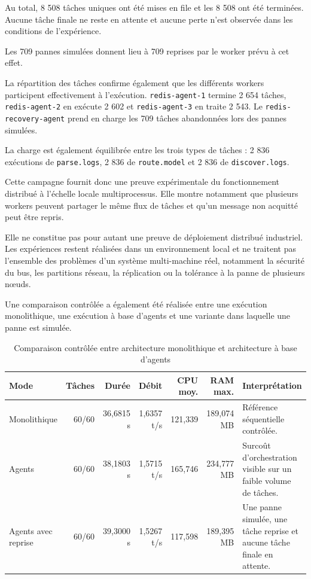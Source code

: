 Au total, 8 508 tâches uniques ont été mises en file et les 8 508 ont été terminées. Aucune tâche finale ne reste en attente et aucune perte n'est observée dans les conditions de l'expérience.

Les 709 pannes simulées donnent lieu à 709 reprises par le worker prévu à cet effet.

La répartition des tâches confirme également que les différents workers participent effectivement à l'exécution. \texttt{redis-agent-1} termine 2 654 tâches, \texttt{redis-agent-2} en exécute 2 602 et \texttt{redis-agent-3} en traite 2 543. Le \texttt{redis-recovery-agent} prend en charge les 709 tâches abandonnées lors des pannes simulées.

La charge est également équilibrée entre les trois types de tâches : 2 836 exécutions de \texttt{parse.logs}, 2 836 de \texttt{route.model} et 2 836 de \texttt{discover.logs}.

Cette campagne fournit donc une preuve expérimentale du fonctionnement distribué à l'échelle locale multiprocessus. Elle montre notamment que plusieurs workers peuvent partager le même flux de tâches et qu'un message non acquitté peut être repris.

Elle ne constitue pas pour autant une preuve de déploiement distribué industriel. Les expériences restent réalisées dans un environnement local et ne traitent pas l'ensemble des problèmes d'un système multi-machine réel, notamment la sécurité du bus, les partitions réseau, la réplication ou la tolérance à la panne de plusieurs nœuds.

Une comparaison contrôlée a également été réalisée entre une exécution monolithique, une exécution à base d'agents et une variante dans laquelle une panne est simulée.

\begin{table}[H]
\centering
\caption{Comparaison contrôlée entre architecture monolithique et architecture à base d'agents}
\label{tab:controlled-monolith-agents}
\scriptsize

\begin{tabularx}{\textwidth}{p{3cm}rrrrrX}
\toprule

\textbf{Mode} &
\textbf{Tâches} &
\textbf{Durée} &
\textbf{Débit} &
\textbf{CPU moy.} &
\textbf{RAM max.} &
\textbf{Interprétation}
\tabularnewline

\midrule

Monolithique &
60/60 &
36,6815 s &
1,6357 t/s &
121,339 &
189,074 MB &
Référence séquentielle contrôlée.
\tabularnewline

Agents &
60/60 &
38,1803 s &
1,5715 t/s &
165,746 &
234,777 MB &
Surcoût d'orchestration visible sur un faible volume de tâches.
\tabularnewline

Agents avec reprise &
60/60 &
39,3000 s &
1,5267 t/s &
117,598 &
189,395 MB &
Une panne simulée, une tâche reprise et aucune tâche finale en attente.
\tabularnewline

\bottomrule
\end{tabularx}
\end{table}

